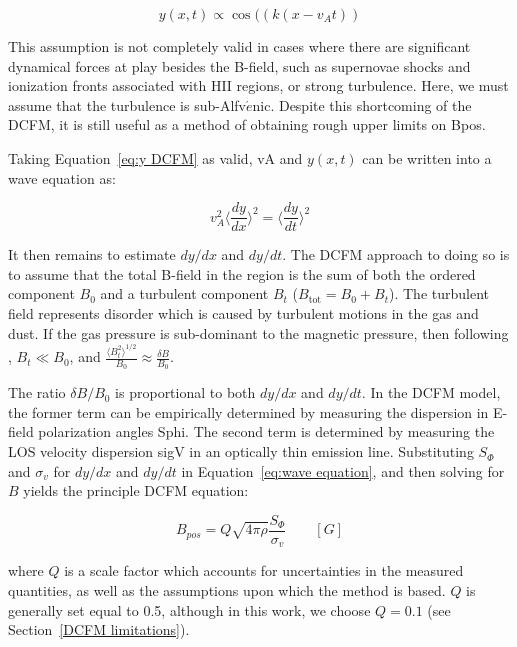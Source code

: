 \begin{equation}\label{eq:y DCFM}
  y(x,t) \propto \mathrm{\cos}({\left( k(x - v_{A}t) \right)}
\end{equation}

This assumption is not completely valid in cases where there are significant dynamical forces at play besides the B-field, such as supernovae shocks and ionization fronts associated with HII regions, or strong turbulence. Here, we must assume that the turbulence is sub-Alfv$\acute{e}$nic. Despite this shortcoming of the DCFM, it is still useful as a method of obtaining rough upper limits on \gls{Bpos}.

Taking Equation~\ref{eq:y DCFM} as valid, \gls{vA} and $y(x, t)$ can be written into a wave equation as:

\begin{equation}\label{eq:wave equation}
  v_{A}^{2} \bigg \langle \frac{dy}{dx}  \bigg \rangle ^{2} = \bigg \langle \frac{dy}{dt}  \bigg \rangle ^{2}
\end{equation}

It then remains to estimate $dy/dx$ and $dy/dt$. The DCFM approach to doing so is to assume that the total B-field in the region is the sum of both the ordered component $B_{0}$ and a turbulent component $B_{t}$ ($B_{\mathrm{tot}} = B_{0} + B_{t}$). The turbulent field represents disorder which is caused by turbulent motions in the gas and dust. If the gas pressure is sub-dominant to the magnetic pressure, then following \citet{hildebrand2009dispersion}, $B_{t} \ll B_{0}$, and $ \frac{\langle B_{t}^{2} \rangle ^{1/2}}{ B_{0} } \approx \frac{ \delta B }{ B_{0} }$.

The ratio $\delta B/ B_{0}$ is proportional to both $dy/dx$ and $dy/dt$. In the DCFM model, the former term can be empirically determined by measuring the dispersion in E-field polarization angles \gls{Sphi}. The second term is determined by measuring the LOS velocity dispersion \gls{sigV} in an optically thin emission line. Substituting $S_{\Phi}$ and $\sigma_{v}$ for $dy/dx$ and $dy/dt$ in Equation~\ref{eq:wave equation}, and then solving for $B$ yields the principle DCFM equation:

\begin{equation}\label{eq:DCFM 1}
    B_{pos} = Q \sqrt{4 \pi \rho}\frac{S_{\Phi}}{\sigma_{v}} \qquad \left[ G \right]
\end{equation}

where $Q$ is a scale factor which accounts for uncertainties in the measured quantities, as well as the assumptions upon which the method is based. $Q$ is generally set equal to 0.5, although in this work, we choose $Q = 0.1$ (see Section~\ref{DCFM limitations}).

